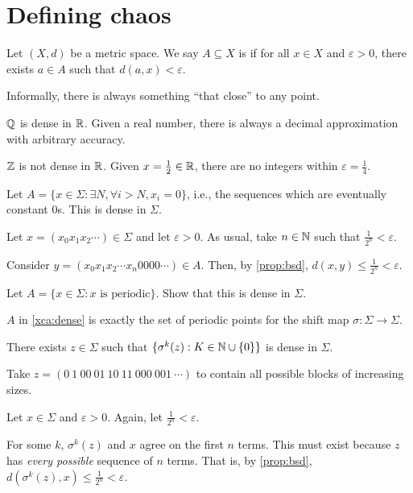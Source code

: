 \documentclass[class=pmath370,tikz,notes]{agony}
\begin{document}
\section{Defining chaos}

\begin{defn}[density]
  Let $(X,d)$ be a metric space.
  We say $A \subseteq X$ is 
  if for all $x \in X$ and $\varepsilon > 0$,
  there exists $a \in A$ such that $d(a,x) < \varepsilon$.
\end{defn}

Informally, there is always something ``that close'' to any point.

\begin{example}
  $\mathbb{Q}$ is dense in $\mathbb{R}$.
  Given a real number, there is always a decimal approximation with arbitrary accuracy.

  $\mathbb{Z}$ is not dense in $\mathbb{R}$.
  Given $x = \frac12 \in \mathbb{R}$, there are no integers within $\varepsilon = \frac14$.
\end{example}

\begin{example}
  Let $A = \{x \in \Sigma : \exists N, \forall i > N, x_i = 0\}$,
  i.e., the sequences which are eventually constant 0s.
  This is dense in $\Sigma$.
\end{example}
\begin{prf}
  Let $x = (x_0x_1x_2\cdots) \in \Sigma$ and let $\varepsilon > 0$.
  As usual, take $n \in \mathbb{N}$ such that $\frac1{2^n} < \varepsilon$.

  Consider $y = (x_0x_1x_2\cdots x_n0000\cdots) \in A$.
  Then, by \cref{prop:bsd}, $d(x,y) \leq \frac{1}{2^n} < \varepsilon$.
\end{prf}

\begin{xca}\label{xca:dense}
  Let $A = \{x \in \Sigma : \text{$x$ is periodic}\}$.
  Show that this is dense in $\Sigma$.
\end{xca}

\begin{remark}
  $A$ in \cref{xca:dense} is exactly the set of periodic points for
  the shift map $\sigma : \Sigma \to \Sigma$.
\end{remark}

\begin{prop}\label{prop:Sdense}
  There exists $z \in \Sigma$ such that $\{\sigma^k(z) : K \in \mathbb{N} \cup \{0\}\}$
  is dense in $\Sigma$.
\end{prop}
\begin{prf}
  Take $z = (0\ 1\ 00\ 01\ 10\ 11\ 000\ 001\ \cdots)$
  to contain all possible blocks of increasing sizes.

  Let $x \in \Sigma$ and $\varepsilon > 0$.
  Again, let $\frac{1}{2^n} < \varepsilon$.

  For some $k$, $\sigma^k(z)$ and $x$ agree on the first $n$ terms.
  This must exist because $z$ has \emph{every possible} sequence of $n$ terms.
  That is, by \cref{prop:bsd}, $d(\sigma^k(z),x) \leq \frac1{2^n} < \varepsilon$.
\end{prf}
\end{document}
